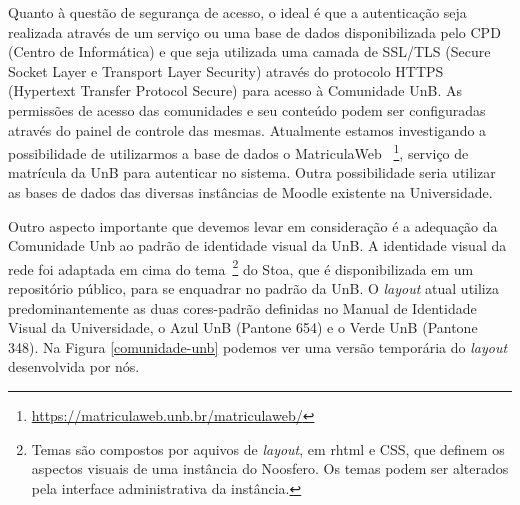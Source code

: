 Quanto à questão de segurança de acesso, o ideal é que a autenticação seja
realizada através de um serviço ou uma base de dados disponibilizada pelo CPD
(Centro de Informática) e que seja utilizada uma camada de SSL/TLS (Secure Socket
Layer e Transport Layer Security) através do protocolo HTTPS (Hypertext Transfer
Protocol Secure) para acesso à Comunidade UnB. As permissões de acesso das
comunidades e seu conteúdo podem ser configuradas através do painel de controle
das mesmas. Atualmente estamos investigando a possibilidade de utilizarmos a
base de dados o MatriculaWeb
~\footnote{\url{https://matriculaweb.unb.br/matriculaweb/}}, serviço de matrícula
da UnB para autenticar no sistema. Outra possibilidade seria utilizar as bases
de dados das diversas instâncias de Moodle existente na Universidade.


Outro aspecto importante que devemos levar em consideração é a adequação da
Comunidade Unb ao padrão de identidade visual da UnB.
A identidade visual da rede foi adaptada em cima do tema~\footnote{Temas são
compostos por aquivos de \textit{layout}, em rhtml e CSS, que definem os aspectos
visuais de uma instância do Noosfero. Os temas podem ser alterados pela interface
administrativa da instância.} do Stoa, que é disponibilizada em um repositório
público, para se enquadrar no padrão da UnB.
%
O \textit{layout} atual utiliza predominantemente as duas cores-padrão definidas
no Manual de Identidade Visual da Universidade\cite{visualUnB}, o Azul UnB
(Pantone 654) e o Verde UnB (Pantone 348). Na Figura \ref{comunidade-unb}
podemos ver uma versão temporária do \textit{layout} desenvolvida por nós.



